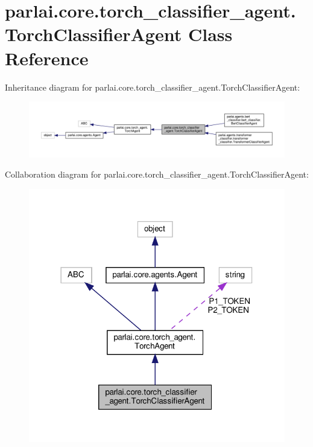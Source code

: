 \hypertarget{classparlai_1_1core_1_1torch__classifier__agent_1_1TorchClassifierAgent}{}\section{parlai.\+core.\+torch\+\_\+classifier\+\_\+agent.\+Torch\+Classifier\+Agent Class Reference}
\label{classparlai_1_1core_1_1torch__classifier__agent_1_1TorchClassifierAgent}


Inheritance diagram for parlai.\+core.\+torch\+\_\+classifier\+\_\+agent.\+Torch\+Classifier\+Agent\+:
\nopagebreak
\begin{figure}[H]
\begin{center}
\leavevmode
\includegraphics[width=350pt]{d5/d0b/classparlai_1_1core_1_1torch__classifier__agent_1_1TorchClassifierAgent__inherit__graph}
\end{center}
\end{figure}


Collaboration diagram for parlai.\+core.\+torch\+\_\+classifier\+\_\+agent.\+Torch\+Classifier\+Agent\+:
\nopagebreak
\begin{figure}[H]
\begin{center}
\leavevmode
\includegraphics[width=318pt]{d7/d70/classparlai_1_1core_1_1torch__classifier__agent_1_1TorchClassifierAgent__coll__graph}
\end{center}
\end{figure}
